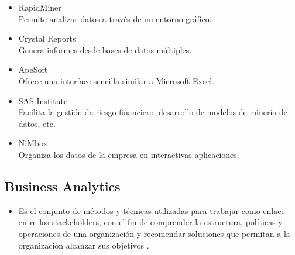 \documentclass[%
 reprint,
 amsmath,amssymb,
 aps,
]{revtex4-1}
\begin{document}
\begin{itemize}
\item  RapidMiner\\
Permite analizar datos a través de un entorno gráfico.
\item  Crystal Reports\\Genera informes desde bases de datos múltiples.
\item  ApeSoft\\Ofrece una interface sencilla similar a Microsoft Excel.
\item  SAS Institute\\Facilita la gestión de riesgo financiero, desarrollo de modelos de minería de datos, etc.
\item  NiMbox\\Organiza los datos de la empresa en interactivas aplicaciones.
 \end{itemize}
\subsection{Business Analytics}
	          \begin{itemize}
		\item  Es el conjunto de métodos y técnicas utilizadas para trabajar como enlace entre los stackeholders, con el fin de comprender la estructura, políticas y operaciones de una organización y recomendar soluciones que permitan a la organización alcanzar sus objetivos .\cite{Oracle1}
	           \end{itemize}
\end{document}
